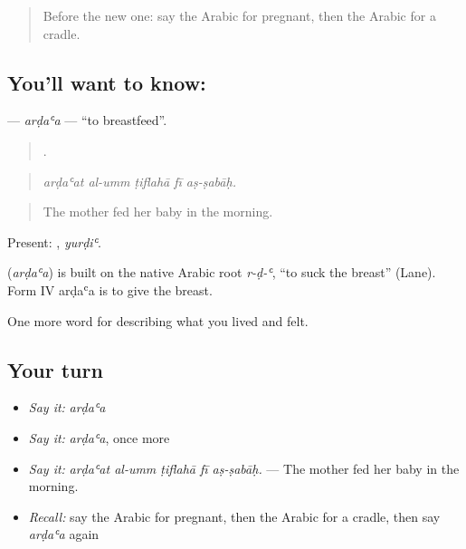 \label{lesson:AR-C530-ardaa}



\begin{quote}
Before the new one: say the Arabic for pregnant, then the Arabic for a cradle.
\end{quote}

\subsection*{You'll want to know: }
\textbf{} — \emph{arḍaʿa} — \textquotedblleft{}to breastfeed\textquotedblright{}.

\begin{quote}
    .
\end{quote}

\begin{quote}
\emph{arḍaʿat al-umm ṭiflahā fī aṣ-ṣabāḥ.}
\end{quote}

\begin{quote}
The mother fed her baby in the morning.
\end{quote}

Present: , \emph{yurḍiʿ}.

\begin{cousinweb}
\textbf{} (\emph{arḍaʿa}) is built on the native Arabic root \emph{r-ḍ-ʿ}, \textquotedblleft{}to suck the breast\textquotedblright{} (Lane). Form IV arḍaʿa is to give the breast.
\end{cousinweb}

\begin{grammarlens}[title={What you've built}]
One more word for describing what you lived and felt.
\end{grammarlens}

\subsection*{Your turn}
\begin{itemize}
\raggedright
  \item \emph{Say it:} \emph{arḍaʿa}
  \item \emph{Say it:} \emph{arḍaʿa}, once more
  \item \emph{Say it:} \emph{arḍaʿat al-umm ṭiflahā fī aṣ-ṣabāḥ.} — The mother fed her baby in the morning.
  \item \emph{Recall:} say the Arabic for pregnant, then the Arabic for a cradle, then say \emph{arḍaʿa} again
\end{itemize}

